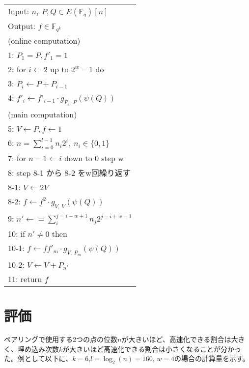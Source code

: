 \documentclass[twocolumn]{jsarticle} %
\begin{document}
\begin{longtable}
 \begin{center}
  \begin{tabular}{|l|}
     \hline
     Input: $n, \ P, Q \in E(\mathbb{F}_q)[n]$ \\
     Output: $f \in \mathbb{F}_{q^k}$  \\
     \hline
     (online computation) \\
     1: \quad $P_1 = P, f'_1=1 $\\
     2: \quad for $i \gets 2$ up to $2^w -1$ do\\
     3: \quad \quad $P_i \gets P + P_{i-1} $\\
     4: \quad \quad $f'_i \gets f'_{i-1} \cdot g_{P_i,\ P}(\psi (Q))$\\

     (main computation) \\
     5: \quad $V \gets P, f \gets 1 $\\
     6: \quad $n=\sum^{l - 1}_{i=0} n_i 2^i, \ n_i \in \{0,1\}$\\

     7: \quad for $ n-1 \gets i$ down to 0 step w\\
     8: \quad step 8-1 から 8-2 をw回繰り返す\\
     8-1: \quad \quad $V \gets 2V $\\
     8-2: \quad \quad $f \gets f^2 \cdot g_{V,\ V}(\psi (Q))$\\

     9: \quad $n' \gets =\sum^{j=i-w+1}_{i} n_{j}2^{j-i+w-1} $\\
     10: \quad if $n' \neq 0$ then\\
     10-1: \quad \quad $f \gets ff'_m \cdot g_{V,\ P_m}(\psi (Q))$ \\
     10-2: \quad \quad $V \gets V + P_{n'} $\\
     11: \quad return $f$\\
     \hline
  \end{tabular}
 \end{center}
\end{longtable}

\section{評価}
ペアリングで使用する2つの点の位数$n$が大きいほど、高速化できる割合は大きく、埋め込み次数$k$が大きいほど高速化できる割合は小さくなることが分かった。例として以下に、$k=6$,$l=\log_2(n)=160$, $w=4$の場合の計算量を示す。
\end{document}
